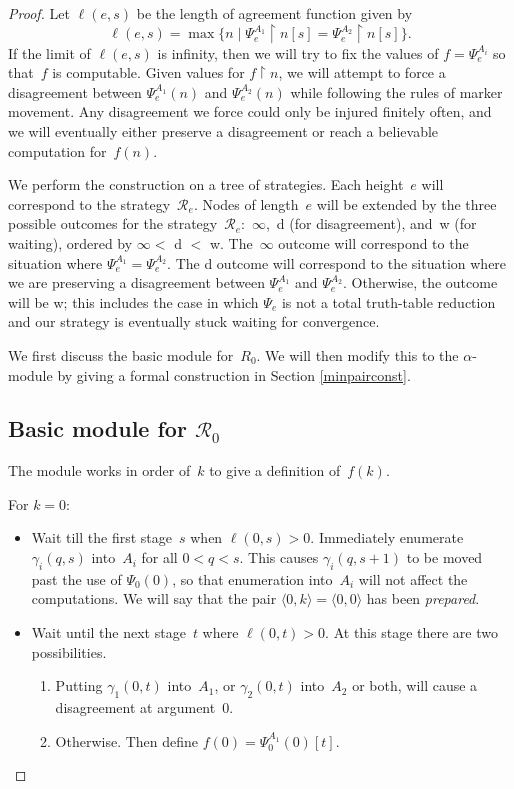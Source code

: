 \documentclass{LMCS}
\newcommand{\0}{\mathbf{0}}
\def\uh{\upharpoonright}
\newcommand{\<}{\langle}
\renewcommand{\>}{\rangle}
\begin{document}
\begin{proof}
Let $\ell(e,s)$ be the length of agreement function given by
$$
\ell(e,s)=\max\{n \mid \Psi_e^{A_1}\uh n[s]=\Psi_e^{A_2}\uh n[s]\}.
$$
If the limit of $\ell(e,s)$ is infinity, then we will try to fix the values
of $f=\Psi_e^{A_i}$ so that~$f$ is computable.  Given values for $f\uh n$, we
will attempt to force a disagreement between $\Psi_e^{A_1}(n)$ and
$\Psi_e^{A_2}(n)$ while following the rules of marker movement.  Any
disagreement we force could only be injured finitely often, and we will
eventually either preserve a disagreement or reach a believable computation
for~$f(n)$.

We perform the construction on a tree of strategies. Each height~$e$ will
correspond to the strategy~$\mathcal R_e$. Nodes of length~$e$ will be
extended by the three possible outcomes for the strategy~$\mathcal
R_e$:~$\infty$,~d (for disagreement), and~w (for waiting), ordered by
$\infty< $ d $ <$ w. The~$\infty$ outcome will correspond to the situation
where $\Psi_e^{A_1} =\Psi_e^{A_2}$. The d outcome will correspond to the
situation where we are preserving a disagreement between $\Psi_e^{A_1}$ and
$\Psi_e^{A_2}$. Otherwise, the outcome will be w; this includes the case in
which $\Psi_e$ is not a total truth-table reduction and our strategy is
eventually stuck waiting for convergence.


We first discuss the basic module for~$R_0$.  We will then modify this to the
$\alpha$-module by giving a formal construction in Section
\ref{minpairconst}.

\noindent
\subsection{\texorpdfstring{Basic module for $\mathcal R_0$}{Basic module for R0}}\label{basic}

The module works in order of~$k$ to give a definition of~$f(k)$.

For $k=0$:

\begin{itemize}
\item Wait till the first stage~$s$ when $\ell(0,s)>0$. Immediately
    enumerate $\gamma_i(q,s)$ into~$A_i$ for all $0<q<s$. This causes
    $\gamma_i(q,s+1)$ to be moved past the use of $\Psi_0(0)$, so that
    enumeration into~$A_i$ will not affect the computations.  We will say
    that the pair $\<0,k\> =\langle 0, 0\rangle$ has been {\em prepared}.
\item Wait until the next stage~$t$ where $\ell(0,t)>0$. At this stage
    there are two possibilities.
\begin{enumerate}
\item Putting $\gamma_1(0,t)$ into~$A_1$, or $\gamma_2(0,t)$
    into~$A_2$ or both, will cause a disagreement at argument~0.
\item Otherwise. Then define $f(0)=\Psi_0^{A_1}(0)[t].$


\end{enumerate}
\end{itemize}
\end{proof}
\end{document}
